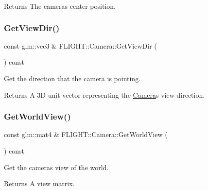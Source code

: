 \begin{DoxyReturn}{Returns}
The camera\textquotesingle{}s center position. 
\end{DoxyReturn}
\mbox{\label{class_f_l_i_g_h_t_1_1_camera_a83bfd99949fecdcd0a52e2f05290fa57}} 
\subsubsection{\texorpdfstring{Get\+View\+Dir()}{GetViewDir()}}
{\footnotesize\ttfamily const glm\+::vec3 \& F\+L\+I\+G\+H\+T\+::\+Camera\+::\+Get\+View\+Dir (\begin{DoxyParamCaption}{ }\end{DoxyParamCaption}) const}



Get the direction that the camera is pointing. 

\begin{DoxyReturn}{Returns}
A 3D unit vector representing the \hyperlink{class_f_l_i_g_h_t_1_1_camera}{Camera}\textquotesingle{}s view direction. 
\end{DoxyReturn}
\mbox{\label{class_f_l_i_g_h_t_1_1_camera_a7f4809df50e4a319fd93de1aad6660c8}} 
\subsubsection{\texorpdfstring{Get\+World\+View()}{GetWorldView()}}
{\footnotesize\ttfamily const glm\+::mat4 \& F\+L\+I\+G\+H\+T\+::\+Camera\+::\+Get\+World\+View (\begin{DoxyParamCaption}{ }\end{DoxyParamCaption}) const}



Get the camera\textquotesingle{}s view of the world. 

\begin{DoxyReturn}{Returns}
A view matrix. 
\end{DoxyReturn}
\mbox{\label{class_f_l_i_g_h_t_1_1_camera_a9141e385388725340f06982d5f606396}} 
